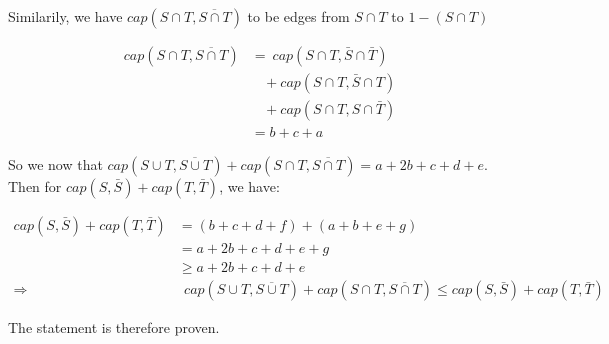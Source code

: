 \documentclass[11pt]{article}
\begin{document}
Similarily, we have $cap(S \cap T, \overline{S \cap T})$ to be edges from $S \cap T$ to $1-(S \cap T)$

\begin{align*}
    cap(S \cap T, \overline{S \cap T}) &= \ cap(S \cap T, \bar{S} \cap \bar{T})\\
    & \ \ \ \ + cap(S \cap T, \bar{S} \cap T) \\
    & \ \ \ \ + cap(S \cap T, S \cap \bar{T}) \\
    &= b + c + a
\end{align*}

So we now that $cap(S \cup T, \overline{S \cup T}) + cap(S \cap T, \overline{S \cap T}) = a + 2b + c + d + e$. Then for $cap(S, \bar{S}) + cap(T, \bar{T})$, we have:

\begin{align*}
    cap(S, \bar{S}) + cap(T, \bar{T}) &= (b + c + d + f) + (a + b + e + g) \\
    &= a + 2b + c + d + e + g \\
    &\geq a + 2b + c + d + e \\
    \Longrightarrow& \ \ cap(S \cup T, \overline{S \cup T}) + cap(S \cap T, \overline{S \cap T})
    \leq cap(S, \bar{S}) + cap(T, \bar{T})
\end{align*}

The statement is therefore proven.
%
% 
% 
\end{document}
